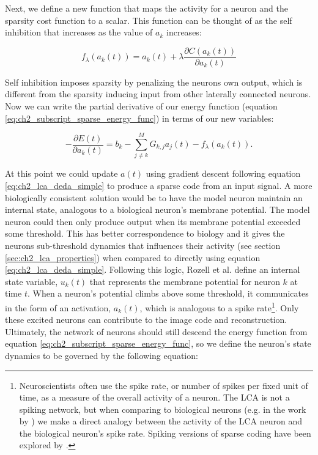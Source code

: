 Next, we define a new function that maps the activity for a neuron and the sparsity cost function to a scalar. This function can be thought of as the self inhibition that increases as the value of $a_{k}$ increases:

\begin{equation}\label{eq:ch2_hopfield_t_func}
  f_{\lambda}(a_{k}(t)) = a_{k}(t) + \lambda \frac{\partial C(a_{k}(t))}{\partial a_{k}(t)}
\end{equation}

Self inhibition imposes sparsity by penalizing the neurons own output, which is different from the sparsity inducing input from other laterally connected neurons. Now we can write the partial derivative of our energy function (equation \eqref{eq:ch2_subscript_sparse_energy_func}) in terms of our new variables:

\begin{equation}\label{eq:ch2_lca_deda_simple}
    - \frac{\partial E(t)}{\partial a_{k}(t)} =
    b_{k} -
    \sum\limits_{j \neq k}^{M} G_{k,j} a_{j}(t) -
    f_{\lambda}(a_{k}(t)).
\end{equation}

At this point we could update $a(t)$ using gradient descent following equation \eqref{eq:ch2_lca_deda_simple} to produce a sparse code from an input signal. A more biologically consistent solution would be to have the model neuron maintain an internal state, analogous to a biological neuron's membrane potential. The model neuron could then only produce output when its membrane potential exceeded some threshold. This has better correspondence to biology and it gives the neurons sub-threshold dynamics that influences their activity (see section \ref{sec:ch2_lca_properties}) when compared to directly using equation \eqref{eq:ch2_lca_deda_simple}. Following this logic, Rozell et al. \citeyearpar{rozell2008sparse} define an internal state variable, $u_{k}(t)$ that represents the membrane potential for neuron $k$ at time $t$. When a neuron's potential climbs above some threshold, it communicates in the form of an activation, $a_{k}(t)$, which is analogous to a spike rate\footnote{Neuroscientists often use the spike rate, or number of spikes per fixed unit of time, as a measure of the overall activity of a neuron. The LCA is not a spiking network, but when comparing to biological neurons (e.g. in the work by \cite{zhu2013visual}) we make a direct analogy between the activity of the LCA neuron and the biological neuron's spike rate. Spiking versions of sparse coding have been explored by \parencite{zylberberg2011sparse, olshausen2003learning}.}. Only these excited neurons can contribute to the image code and reconstruction. Ultimately, the network of neurons should still descend the energy function from equation \eqref{eq:ch2_subscript_sparse_energy_func}, so we define the neuron's state dynamics to be governed by the following equation:

